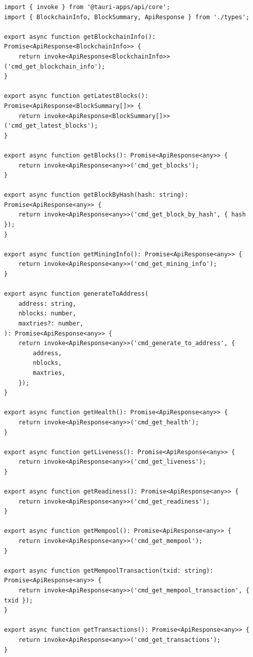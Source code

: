 \begin{listing}[H]
\caption{IPC command wrappers ()}
\label{lst:ch17-commands-ts}
\begin{verbatim}
import { invoke } from '@tauri-apps/api/core';
import { BlockchainInfo, BlockSummary, ApiResponse } from './types';

export async function getBlockchainInfo(): Promise<ApiResponse<BlockchainInfo>> {
    return invoke<ApiResponse<BlockchainInfo>>('cmd_get_blockchain_info');
}

export async function getLatestBlocks(): Promise<ApiResponse<BlockSummary[]>> {
    return invoke<ApiResponse<BlockSummary[]>>('cmd_get_latest_blocks');
}

export async function getBlocks(): Promise<ApiResponse<any>> {
    return invoke<ApiResponse<any>>('cmd_get_blocks');
}

export async function getBlockByHash(hash: string): Promise<ApiResponse<any>> {
    return invoke<ApiResponse<any>>('cmd_get_block_by_hash', { hash });
}

export async function getMiningInfo(): Promise<ApiResponse<any>> {
    return invoke<ApiResponse<any>>('cmd_get_mining_info');
}

export async function generateToAddress(
    address: string,
    nblocks: number,
    maxtries?: number,
): Promise<ApiResponse<any>> {
    return invoke<ApiResponse<any>>('cmd_generate_to_address', {
        address,
        nblocks,
        maxtries,
    });
}

export async function getHealth(): Promise<ApiResponse<any>> {
    return invoke<ApiResponse<any>>('cmd_get_health');
}

export async function getLiveness(): Promise<ApiResponse<any>> {
    return invoke<ApiResponse<any>>('cmd_get_liveness');
}

export async function getReadiness(): Promise<ApiResponse<any>> {
    return invoke<ApiResponse<any>>('cmd_get_readiness');
}

export async function getMempool(): Promise<ApiResponse<any>> {
    return invoke<ApiResponse<any>>('cmd_get_mempool');
}

export async function getMempoolTransaction(txid: string): Promise<ApiResponse<any>> {
    return invoke<ApiResponse<any>>('cmd_get_mempool_transaction', { txid });
}

export async function getTransactions(): Promise<ApiResponse<any>> {
    return invoke<ApiResponse<any>>('cmd_get_transactions');
}


\end{verbatim}
\end{listing}
